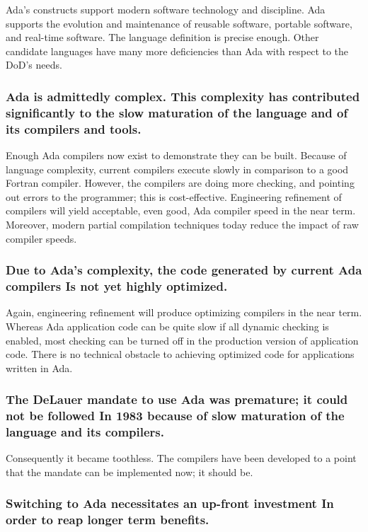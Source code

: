 \documentclass[11pt,final]{article}
\begin{document}
Ada’s constructs support modern software technology and discipline. Ada
supports the evolution and maintenance of reusable software, portable software,
and real-time software. The language definition is precise enough.  Other
candidate languages have many more deficiencies than Ada with respect to the
DoD’s needs.

\subsubsection*{Ada is admittedly complex. This complexity has contributed
significantly to the slow maturation of the language and of its compilers and
tools.}

Enough Ada compilers now exist to demonstrate they can be built. Because of
language complexity, current compilers execute slowly in comparison to a good
Fortran compiler. However, the compilers are doing more checking, and pointing
out errors to the programmer; this is cost-effective. Engineering refinement of
compilers will yield acceptable, even good, Ada compiler speed in the near
term. Moreover, modern partial compilation techniques today reduce the impact
of raw compiler speeds.

\subsubsection*{Due to Ada’s complexity, the code generated by current Ada
compilers Is not yet highly optimized.}

Again, engineering refinement will produce optimizing compilers in the near
term. Whereas Ada application code can be quite slow if all dynamic checking
is enabled, most checking can be turned off in the production version of
application code. There is no technical obstacle to achieving optimized code
for applications written in Ada.

\subsubsection*{The DeLauer mandate to use Ada was premature; it could not be
followed In 1983 because of slow maturation of the language and its
compilers.}

Consequently it became toothless. The compilers have been developed to a point
that the mandate can be implemented now; it should be.

\subsubsection*{Switching to Ada necessitates an up-front investment In order
to reap longer term benefits.}
\end{document}
